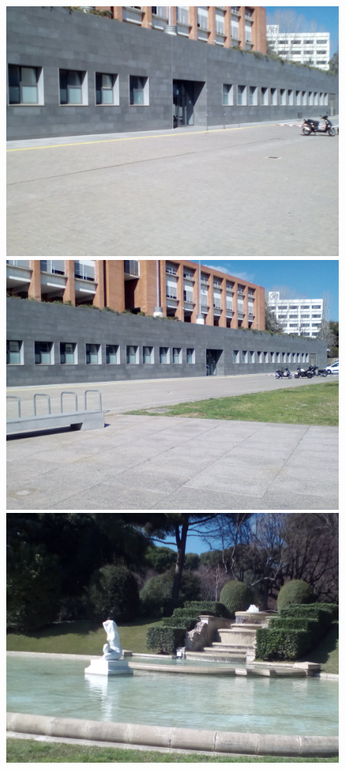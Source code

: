 		\begin{figure}[!htb]
				\includegraphics[width=\linewidth]{images/experiments/uni1}
				\label{fig:awesome_image1}
			\endminipage\hfill
				\includegraphics[width=\linewidth]{images/experiments/uni2}
				\label{fig:awesome_image2}
			\endminipage\hfill
				\includegraphics[width=\linewidth]{images/experiments/jardi_2}

\end{figure}
